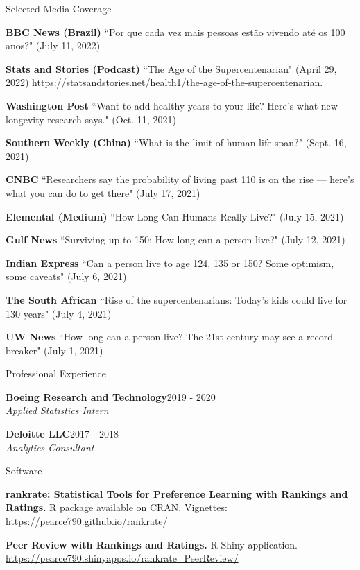 \documentclass{resume} %
\begin{document}
\begin{rSection}{Selected Media Coverage}


\textbf{BBC News (Brazil)} ``Por que cada vez mais pessoas est\~{a}o vivendo at\'{e} os 100 anos?" (July 11, 2022)

\textbf{Stats and Stories (Podcast)} ``The Age of the Supercentenarian" (April 29, 2022) \url{https://statsandstories.net/health1/the-age-of-the-supercentenarian}.

\textbf{Washington Post} ``Want to add healthy years to your life? Here’s what new longevity research says." (Oct. 11, 2021)

\textbf{Southern Weekly (China)} ``What is the limit of human life span?" (Sept. 16, 2021)

\textbf{CNBC} ``Researchers say the probability of living past 110 is on the rise — here’s what you can do to get there" (July 17, 2021)

\textbf{Elemental (Medium)} ``How Long Can Humans Really Live?" (July 15, 2021)

\textbf{Gulf News} ``Surviving up to 150: How long can a person live?" (July 12, 2021)

\textbf{Indian Express} ``Can a person live to age 124, 135 or 150? Some optimism, some caveats" (July 6, 2021)

\textbf{The South African} ``Rise of the supercentenarians: Today’s kids could live for 130 years" (July 4, 2021)

\textbf{UW News} ``How long can a person live? The 21st century may see a record-breaker" (July 1, 2021)


\end{rSection}



\begin{rSection}{Professional Experience}

\textbf{Boeing Research and Technology}\hfill{2019 - 2020}
\\{\it Applied Statistics Intern}

\textbf{Deloitte LLC}\hfill{2017 - 2018}
\\{\it Analytics Consultant}

\end{rSection}

\begin{rSection}{Software}

\textbf{rankrate: Statistical Tools for Preference Learning with Rankings and Ratings.} R package available on CRAN. Vignettes: \url{https://pearce790.github.io/rankrate/} 

\textbf{Peer Review with Rankings and Ratings.} R Shiny application. \url{https://pearce790.shinyapps.io/rankrate_PeerReview/}

\end{rSection}
\end{document}
